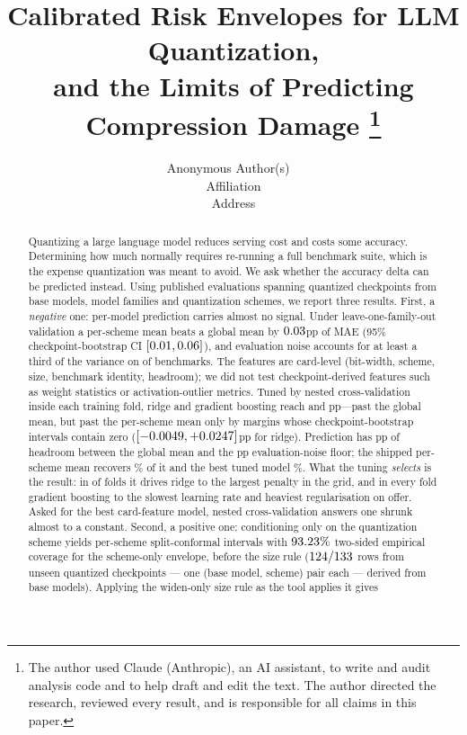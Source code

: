 \documentclass[10pt]{article}
\title{Calibrated Risk Envelopes for LLM Quantization,\\
and the Limits of Predicting Compression Damage%
\thanks{The author used Claude (Anthropic), an AI assistant, to write and audit analysis code and to help draft and edit the text. The author directed the research, reviewed every result, and is responsible for all claims in this paper.}}
\author{\name Anonymous Author(s) \email ~\\
      \addr Affiliation\\
      Address}
\begin{document}
\maketitle

\begin{abstract}
\noindent
Quantizing a large language model reduces serving cost and costs some accuracy.
Determining how much normally requires re-running a full benchmark suite, which
is the expense quantization was meant to avoid. We ask whether the accuracy
delta can be predicted instead. Using \Nrows{} published evaluations spanning
\NQuantCkpt{} quantized checkpoints from \NBase{} base models, \Nfam{} model
families and \Nsch{} quantization schemes, we report three results. First, a \emph{negative} one: per-model
prediction carries almost no signal. Under leave-one-family-out validation a
per-scheme mean beats a global mean by \(0.03\)pp of MAE (95\%
checkpoint-bootstrap CI \([0.01, 0.06]\)), and evaluation noise
accounts for at least a third of the variance on \NoiseNThird{} of
\NoiseNBench{} benchmarks. The features are card-level (bit-width, scheme,
size, benchmark identity, headroom); we did not test checkpoint-derived
features such as weight statistics or activation-outlier metrics. Tuned by
nested cross-validation inside each training fold, ridge and gradient boosting
reach \MaeRidgeTuned{} and \MaeGradboostTuned{}pp---past the global mean, but
past the per-scheme mean only by margins whose checkpoint-bootstrap intervals
contain zero (\([-0.0049, +0.0247]\)pp for ridge).
Prediction has \HeadroomPp{}pp of headroom between the global mean and the
\MaeFloor{}pp evaluation-noise floor; the shipped per-scheme mean recovers
\SchemeHeadroomPct{}\% of it and the best tuned model
\PredBestHeadroomPct{}\%. What the tuning \emph{selects} is the result: in
\TuneRidgeFoldsEdge{} of \TuneOuterFolds{} folds it drives ridge to the
largest penalty in the grid, and in every fold gradient boosting to the
slowest learning rate and heaviest regularisation on offer. Asked for the best
card-feature model, nested cross-validation answers one shrunk almost to a
constant.
Second, a positive one: conditioning only on the quantization scheme yields
per-scheme split-conformal intervals with \(93.23\%\) two-sided
empirical coverage for the scheme-only envelope, before the size rule
(\(124/133\) rows from \ProspClusN{} unseen quantized
checkpoints --- one (base model, scheme) pair each --- derived from
\ProspBases{} base models). Applying the widen-only size rule as the tool applies it gives

\end{abstract}
\end{document}
